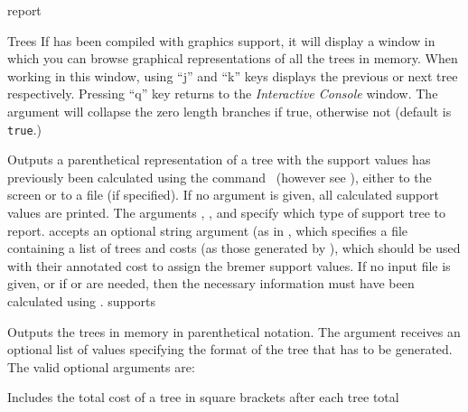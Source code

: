 \begin{command}{report}{}
\begin{arguments}
\begin{argumentgroup}{Trees}
                {If \poy has been compiled with graphics support, it 
                will display a window in which you can
                browse graphical representations of all the trees in memory.
                When working in this window, using ``j'' and ``k'' keys displays the
                previous or next tree respectively. Pressing ``q'' key 
                returns to the \emph{Interactive Console} window. The argument
                 will collapse the zero length branches if
                true, otherwise not (default is \texttt{true}.)} 
	     {}

                {Outputs a parenthetical representation of a tree with the
                support values has previously been calculated using the
                command~ (however see
                ),
                either to the screen or to a file (if specified). If no argument
                is given, all calculated support values are printed. The arguments
                , , and
                 specify which type of support tree to
                report.  accepts an optional string argument
                (as in , 
                which specifies a file containing a list of trees and costs (as
                those generated by ), which should be used with
                their annotated cost to assign the bremer support values. 
                If no input file is given, or if  or
                 are needed,
                then the necessary information must have been calculated 
                using .}
                {supports}

                {Outputs the trees in memory in parenthetical notation. The argument
                 receives an optional list of values
                specifying the format of the tree that has to be generated. The
                valid optional arguments are:  
                
                \begin{description}
                        {Includes the total cost of a tree in square brackets
                        after each tree}
                        {total}


\end{description}}
\end{argumentgroup}
\end{arguments}
\end{command}
